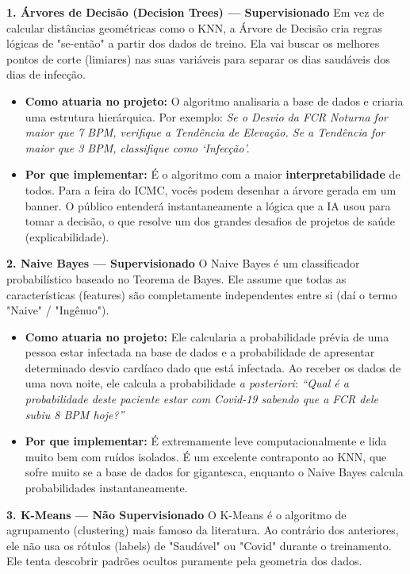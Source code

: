 \begin{description}
    \textbf{1. Árvores de Decisão (Decision Trees) --- Supervisionado}
    Em vez de calcular distâncias geométricas como o KNN, a Árvore de Decisão cria regras lógicas de "se-então" a partir dos dados de treino. Ela vai buscar os melhores pontos de corte (limiares) nas suas variáveis para separar os dias saudáveis dos dias de infecção.

    \begin{itemize}
        \item \textbf{Como atuaria no projeto:} O algoritmo analisaria a base de dados e criaria uma estrutura hierárquica. Por exemplo: \textit{Se o Desvio da FCR Noturna for maior que 7 BPM, verifique a Tendência de Elevação. Se a Tendência for maior que 3 BPM, classifique como `Infecção'.}
        \item \textbf{Por que implementar:} É o algoritmo com a maior \textbf{interpretabilidade} de todos. Para a feira do ICMC, vocês podem desenhar a árvore gerada em um banner. O público entenderá instantaneamente a lógica que a IA usou para tomar a decisão, o que resolve um dos grandes desafios de projetos de saúde (explicabilidade).
    \end{itemize}

    \textbf{2. Naive Bayes --- Supervisionado}
    O Naive Bayes é um classificador probabilístico baseado no Teorema de Bayes. Ele assume que todas as características (features) são completamente independentes entre si (daí o termo "Naive" / "Ingênuo").

    \begin{itemize}
        \item \textbf{Como atuaria no projeto:} Ele calcularia a probabilidade prévia de uma pessoa estar infectada na base de dados e a probabilidade de apresentar determinado desvio cardíaco dado que está infectada. Ao receber os dados de uma nova noite, ele calcula a probabilidade \textit{a posteriori}: \textit{``Qual é a probabilidade deste paciente estar com Covid-19 sabendo que a FCR dele subiu 8 BPM hoje?''}
        \item \textbf{Por que implementar:} É extremamente leve computacionalmente e lida muito bem com ruídos isolados. É um excelente contraponto ao KNN, que sofre muito se a base de dados for gigantesca, enquanto o Naive Bayes calcula probabilidades instantaneamente.
    \end{itemize}

    \textbf{3. K-Means --- Não Supervisionado}
    O K-Means é o algoritmo de agrupamento (clustering) mais famoso da literatura. Ao contrário dos anteriores, ele não usa os rótulos (labels) de "Saudável" ou "Covid" durante o treinamento. Ele tenta descobrir padrões ocultos puramente pela geometria dos dados.


\end{description}
